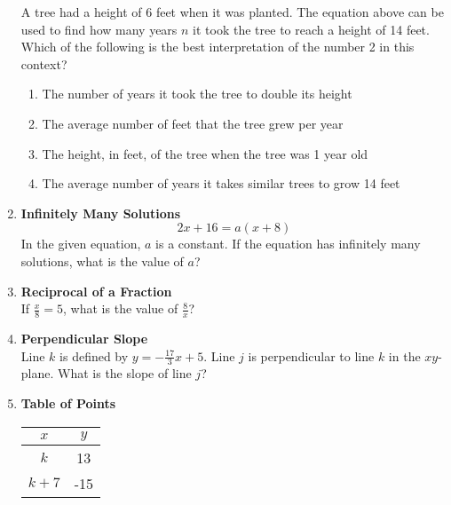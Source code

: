 \begin{enumerate}
A tree had a height of 6 feet when it was planted. The equation above can be used to find how many years $n$ it took the tree to reach a height of 14 feet. Which of the following is the best interpretation of the number 2 in this context?
\begin{enumerate}[label=(\Alph*)]
  \item The number of years it took the tree to double its height
  \item The average number of feet that the tree grew per year
  \item The height, in feet, of the tree when the tree was 1 year old
  \item The average number of years it takes similar trees to grow 14 feet
\end{enumerate}
\begin{subanswer}
\end{subanswer}

\item \textbf{Infinitely Many Solutions}\\
$$
2x + 16 = a(x + 8)
$$
In the given equation, $a$ is a constant. If the equation has infinitely many solutions, what is the value of $a$?
\begin{subanswer}
\end{subanswer}

\item \textbf{Reciprocal of a Fraction}\\
If $\frac{x}{8} = 5$, what is the value of $\frac{8}{x}$?
\begin{subanswer}
\end{subanswer}

\item \textbf{Perpendicular Slope}\\
Line $k$ is defined by $y = -\frac{17}{3}x + 5$. Line $j$ is perpendicular to line $k$ in the $xy$-plane. What is the slope of line $j$?
\begin{subanswer}
\end{subanswer}

\item \textbf{Table of Points}\\
\begin{center}
\begin{tabular}{|c|c|}
\hline
$x$ & $y$ \\
\hline
$k$ & 13 \\
\hline
$k+7$ & -15 \\
\hline
\end{tabular}
\end{center}


\end{enumerate}
